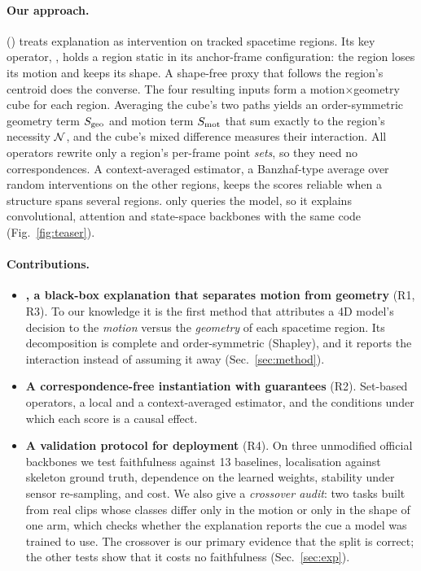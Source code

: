 \paragraph{Our approach.}
\methodlong (\method) treats explanation as intervention on tracked spacetime regions. Its key operator, \frz, holds a region static in its anchor-frame configuration: the region loses its motion and keeps its shape. A shape-free proxy that follows the region's centroid does the converse. The four resulting inputs form a motion$\times$geometry cube for each region. Averaging the cube's two paths yields an order-symmetric geometry term $S_{\mathrm{geo}}$ and motion term $S_{\mathrm{mot}}$ that sum exactly to the region's necessity $\mathcal{N}$, and the cube's mixed difference measures their interaction. All operators rewrite only a region's per-frame point \emph{sets}, so they need no correspondences. A context-averaged estimator, a Banzhaf-type average over random interventions on the other regions, keeps the scores reliable when a structure spans several regions. \method only queries the model, so it explains convolutional, attention and state-space backbones with the same code (Fig.~\ref{fig:teaser}).

\paragraph{Contributions.}
\begin{itemize}[leftmargin=1.2em,itemsep=2pt,topsep=2pt]
\item \textbf{\method, a black-box explanation that separates motion from geometry} (R1, R3). To our knowledge it is the first method that attributes a 4D model's decision to the \emph{motion} versus the \emph{geometry} of each spacetime region. Its decomposition is complete and order-symmetric (Shapley), and it reports the interaction instead of assuming it away (Sec.~\ref{sec:method}).
\item \textbf{A correspondence-free instantiation with guarantees} (R2). Set-based operators, a local and a context-averaged estimator, and the conditions under which each score is a causal effect.
\item \textbf{A validation protocol for deployment} (R4). On three unmodified official backbones we test faithfulness against 13 baselines, localisation against skeleton ground truth, dependence on the learned weights, stability under sensor re-sampling, and cost. We also give a \emph{crossover audit}: two tasks built from real clips whose classes differ only in the motion or only in the shape of one arm, which checks whether the explanation reports the cue a model was trained to use. The crossover is our primary evidence that the split is correct; the other tests show that it costs no faithfulness (Sec.~\ref{sec:exp}).
\end{itemize}
